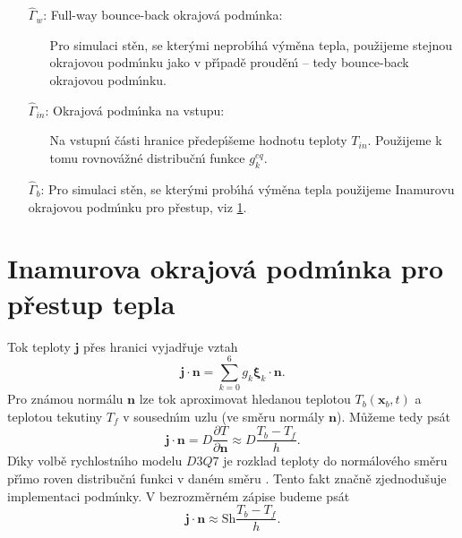         \begin{itemize}
            \item[$\hat{\Gamma}_w$:]  Full-way bounce-back okrajov\'{a} podm\'{\i}nka: \begin{itemize} 
                
                \item[] Pro simulaci st\v{e}n, se kter\'{y}mi neprob\'{\i}h\'{a} v\'{y}m\v{e}na tepla, pou\v{z}ijeme stejnou okrajovou podm\'{\i}nku jako v p\v{r}\'{\i}pad\v{e} proud\v{e}n\'{\i} -- tedy bounce-back okrajovou podm\'{\i}nku. \end{itemize}
            \item[$\hat{\Gamma}_{in}$:] Okrajov\'{a} podm\'{\i}nka na vstupu: \begin{itemize}
                    \item [] Na vstupn\'{\i} \v{c}\'{a}sti hranice p\v{r}edep\'{\i}\v{s}eme hodnotu teploty $T_{in}$. Pou\v{z}ijeme k tomu rovnov\'{a}\v{z}n\'{e} distribu\v{c}n\'{\i} funkce $g_k^{eq}$.
                    \end{itemize}
            \item[$\hat{\Gamma}_{b}$:] Pro simulaci st\v{e}n, se kter\'{y}mi prob\'{\i}h\'{a} v\'{y}m\v{e}na tepla pou\v{z}ijeme Inamurovu okrajovou podm\'{\i}nku pro p\v{r}estup, viz \ref{sec:TraBouCon}.
        \end{itemize}


    \section{Inamurova okrajov\'{a} podm\'{\i}nka pro p\v{r}estup tepla}
    \label{sec:TraBouCon}
        
        Tok teploty $\boldsymbol{j}$ p\v{r}es hranici vyjad\v{r}uje vztah
        \begin{equation}
            \boldsymbol{j} \cdot \boldsymbol{n} = \sum_{k=0}^{6} g_k \boldsymbol{\xi}_k \cdot \boldsymbol{n}. 
        \end{equation}
        Pro zn\'{a}mou norm\'{a}lu $\boldsymbol{n}$ lze tok aproximovat hledanou teplotou $T_b (\boldsymbol{x}_b, t)$ a teplotou tekutiny $T_f$ v sousedn\'{\i}m uzlu (ve sm\v{e}ru norm\'{a}ly $\boldsymbol{n}$). M\r{u}\v{z}eme tedy ps\'{a}t
        \begin{equation}
            \boldsymbol{j} \cdot \boldsymbol{n} = D \frac{\partial T}{\partial \boldsymbol{n}} \approx D \frac{T_b - T_f}{h}.
        \end{equation}   
        D\'{\i}ky volb\v{e} rychlostn\'{\i}ho modelu $D3Q7$ je rozklad teploty do norm\'{a}lov\'{e}ho sm\v{e}ru p\v{r}\'{\i}mo roven distribu\v{c}n\'{\i} funkci v dan\'{e}m sm\v{e}ru \cite{kruger2017lattice}. Tento fakt zna\v{c}n\v{e} zjednodu\v{s}uje implementaci podm\'{\i}nky. V bezrozm\v{e}rn\'{e}m z\'{a}pise budeme ps\'{a}t
        \begin{equation}
            \boldsymbol{j} \cdot \boldsymbol{n} \approx \mathrm{Sh} \frac{T_b - T_f}{h}.
        \end{equation}
        
